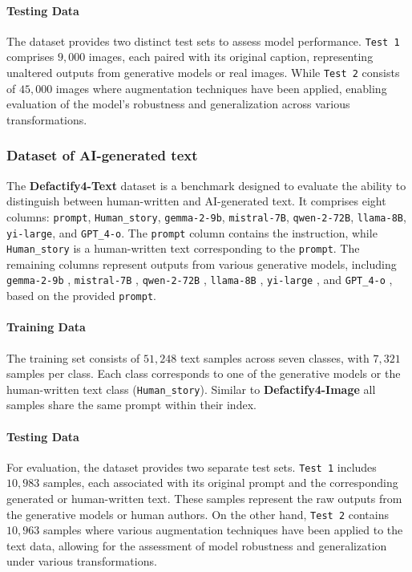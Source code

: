 \paragraph{Testing Data} The dataset provides two distinct test sets to assess model performance. \texttt{Test 1} comprises $9,000$ images, each paired with its original caption, representing unaltered outputs from generative models or real images. While \texttt{Test 2} consists of $45,000$ images where augmentation techniques have been applied, enabling evaluation of the model's robustness and generalization across various transformations.

\subsubsection{Dataset of AI-generated text}
\label{sec:data_text}
The \textbf{Defactify4-Text} dataset is a benchmark designed to evaluate the ability to distinguish between human-written and AI-generated text. It comprises eight columns: \texttt{prompt}, \texttt{Human\_story}, \texttt{gemma-2-9b}, \texttt{mistral-7B}, \texttt{qwen-2-72B}, \texttt{llama-8B}, \texttt{yi-large}, and \texttt{GPT\_4-o}. The \texttt{prompt} column contains the instruction, while \texttt{Human\_story} is a human-written text corresponding to the \texttt{prompt}. The remaining columns represent outputs from various generative models, including \texttt{gemma-2-9b} \cite{gemma_2024}, \texttt{mistral-7B} \cite{jiang2023mistral}, \texttt{qwen-2-72B} \cite{qwen2}, \texttt{llama-8B} \cite{llama3modelcard}, \texttt{yi-large} \cite{young2024yi}, and \texttt{GPT\_4-o} \cite{achiam2023gpt}, based on the provided \texttt{prompt}.

\paragraph{Training Data}
The training set consists of $51,248$ text samples across seven classes, with $7,321$ samples per class. Each class corresponds to one of the generative models or the human-written text class (\texttt{Human\_story}). Similar to \textbf{Defactify4-Image} all samples share the same prompt within their index.

\paragraph{Testing Data}
For evaluation, the dataset provides two separate test sets. \texttt{Test 1} includes $10,983$ samples, each associated with its original prompt and the corresponding generated or human-written text. These samples represent the raw outputs from the generative models or human authors. On the other hand, \texttt{Test 2} contains $10,963$ samples where various augmentation techniques have been applied to the text data, allowing for the assessment of model robustness and generalization under various transformations.

